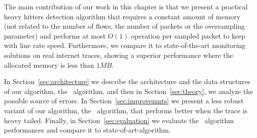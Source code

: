 The main contribution of our work in this chapter is that we present a practical heavy hitters detection algorithm that requires a constant amount of memory (not related to the number of flows, the number of packets or the oversampling parameter) and performs at most $O(1)$ operation per sampled packet to keep with line rate speed. Furthermore, we compare it to state-of-the-art monitoring solutions on real internet traces, showing a superior performance where the allocated memory is less than $1MB$.

In Section~\ref{sec:architecture} we describe the architecture and the data structures of our algorithm, the \cs\ algorithm, and then in Section~\ref{sec:theory}, we analyze the possible source of errors. In Section~\ref{sec:improvemnts} we present a less robust variant of our algorithm, the \eb\ algorithm, that performs better when the trace is heavy tailed. Finally, in Section~\ref{sec:evaluation} we evaluate the \cs\ algorithm performances and compare it to state-of-art-algorithm.
